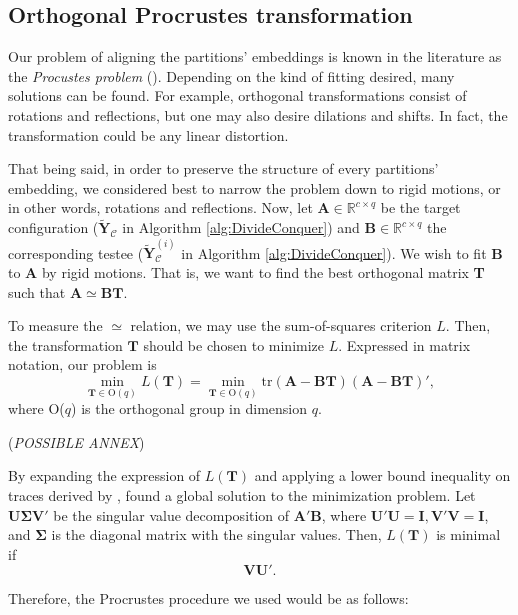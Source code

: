 \subsection{Orthogonal Procrustes transformation}
\label{sec:Procrustes}

Our problem of aligning the partitions' embeddings is known in the literature as the \textit{Procustes problem} (\cite{Borg2005}). Depending on the kind of fitting desired, many solutions can be found. For example, orthogonal transformations consist of rotations and reflections, but one may also desire dilations and shifts. In fact, the transformation could be any linear distortion.

That being said, in order to preserve the structure of every partitions' embedding, we considered best to narrow the problem down to rigid motions, or in other words, rotations and reflections. Now, let $\mathbf{A} \in \mathbb{R}^{c \times q}$ be the target configuration ($\mathbf{\tilde{Y}}_{\mathcal{C}}$ in Algorithm \ref{alg:DivideConquer}) and $\mathbf{B} \in \mathbb{R}^{c \times q}$ the corresponding testee ($\mathbf{\tilde{Y}}_{\mathcal{C}}^{(i)}$ in Algorithm \ref{alg:DivideConquer}). We wish to fit \textbf{B} to \textbf{A} by rigid motions. That is, we want to find the best orthogonal matrix \textbf{T} such that $\mathbf{A} \simeq \mathbf{BT}$.

To measure the $\simeq$ relation, we may use the sum-of-squares criterion $L$. Then, the transformation $\mathbf{T}$ should be chosen to minimize $L$. Expressed in matrix notation, our problem is
$$
\min_{\mathbf{T} \in \text{O}(q)} L(\mathbf{T}) = \min_{\mathbf{T} \in \text{O}(q)} \text{tr}(\mathbf{A}-\mathbf{BT})(\mathbf{A}-\mathbf{BT})',
$$
where O($q$) is the orthogonal group in dimension $q$.

(\textit{POSSIBLE ANNEX})

By expanding the expression of $L(\mathbf{T})$ and applying a lower bound inequality on traces derived by \cite{Kristof1970}, \cite{Borg2005} found a global solution to the minimization problem. Let $\mathbf{U}\boldsymbol{\Sigma}\mathbf{V}'$ be the singular value decomposition of $\mathbf{A}' \mathbf{B}$, where $\mathbf{U}' \mathbf{U}=\mathbf{I}, \mathbf{V}' \mathbf{V}=\mathbf{I}$, and $\boldsymbol{\Sigma}$ is the diagonal matrix with the singular values. Then, $L(\mathbf{T})$ is minimal if
$$
\mathbf{V} \mathbf{U}'.
$$

Therefore, the Procrustes procedure we used would be as follows:

